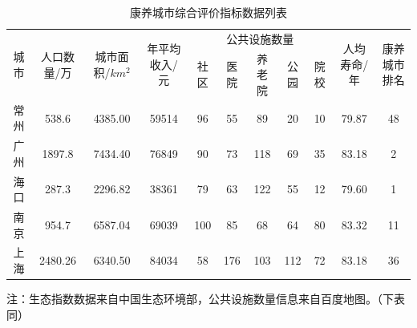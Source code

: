 \documentclass[12pt,a4paper]{article}
\begin{document}
\begin{table}[h]
  \centering
  \caption{康养城市综合评价指标数据列表}
  \begin{adjustbox}{width=\textwidth}
  \begin{tabular}{c|c|c|c|ccccc|c|c}
    \toprule[2pt]
    \multirow{2}{*}{城市} & \multirow{2}{*}{人口数量/万} & \multirow{2}{*}{城市面积/$km^2$}& \multirow{2}{*}{年平均收入/元}& \multicolumn{5}{c|}{公共设施数量} &\multirow{2}{*}{人均寿命/年}&\multirow{2}{*}{康养城市排名\cite{06}}\\
    \cline{5-9}
    & & & & 社区 & 医院 & 养老院 & 公园 & 院校 & &\\
    \midrule[1pt]
    常州 & 538.6 & 4385.00 &59514& 96 & 55 & 89 & 20 & 10 & 79.87 &48\\
    广州 & 1897.8 & 7434.40 &76849& 90 & 73 & 118 & 69 & 35 & 83.18 &2\\
    海口 & 287.3 & 2296.82 &38361& 79 & 63 & 122 & 55 & 12 & 79.60 &1\\
    南京 & 954.7 & 6587.04 &69039& 100 & 85 & 68 & 64 & 80 & 83.32 &11\\
    上海 & 2480.26 & 6340.50 &84034& 58 & 176 & 103 & 112 & 72 & 83.18 &36\\
    \bottomrule[2pt]
  \end{tabular}
  \end{adjustbox}

  \vspace{0.5em}
  {\footnotesize 注：生态指数数据来自中国生态环境部，公共设施数量信息来自百度地图。（下表同）}
\end{table}
\end{document}
